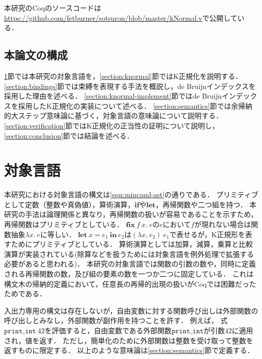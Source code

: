 \documentclass[T]{compsoft}
\newcommand{\keyword}[1]{\mathbf{#1}}
\newcommand{\IF}{\keyword{if}}
\newcommand{\LET}{\keyword{let}}
\newcommand{\FIX}{\keyword{fix}}
\newcommand{\IN}{\keyword{in}}
\begin{document}
本研究のCoqのソースコードは\url{https://github.com/fetburner/sotsuron/blob/master/kNormal.v}で公開している．

\subsection{本論文の構成}
\ref{section:target}節では本研究の対象言語を，\ref{section:knormal}節ではK正規化を説明する．
\ref{section:bindings}節では束縛を表現する手法を概説し，de Bruijnインデックスを採用した理由を述べる．
\ref{section:knormal-implement}節ではde Bruijnインデックスを採用したK正規化の実装について述べる．
\ref{section:semantics}節では余帰納的大ステップ意味論に基づく，対象言語の意味論について説明する．
\ref{section:verification}節ではK正規化の正当性の証明について説明し，
\ref{section:conclusion}節では結論を述べる．

\section{対象言語}\label{section:target}
本研究における対象言語の構文は\figurename\ref{eqn:mincaml-ast}の通りである．
プリミティブとして定数（整数や真偽値），算術演算，$\IF$や$\LET$，再帰関数や二つ組を持つ．
本研究の手法は論理関係と異なり，再帰関数の扱いが容易であることを示すため，再帰関数はプリミティブとしている．
$\FIX~f~x.~e$の$e$において$f$が現れない場合は関数抽象$\lambda x.~e$に等しい．
$\LET~x=e_1~\IN~e_2$は$(\lambda x.~e_2)~e_1$で表せるが，K正規形を表すためにプリミティブとしている．
算術演算としては加算，減算，乗算と比較演算が実装されている(除算などを扱うためには対象言語を例外処理で拡張する必要があると思われる)．
本研究の対象言語では関数の引数の数や，同時に定義される再帰関数の数，及び組の要素の数を一つか二つに固定している．
これは構文木の帰納的定義において，任意長の再帰的出現の扱いがCoqでは困難だったためである．

入出力専用の構文は存在しないが，自由変数に対する関数呼び出しは外部関数の呼び出しとみなし，外部関数が副作用を持つことを許す．
例えば，%
式$\texttt{print\_int}~42$を評価すると，自由変数である外部関数$\texttt{print\_int}$が引数$42$に適用され，値を返す．
ただし，簡単化のために外部関数は整数を受け取って整数を返すものに限定する．
以上のような意味論は\ref{section:semantics}節で定義する．
\end{document}
